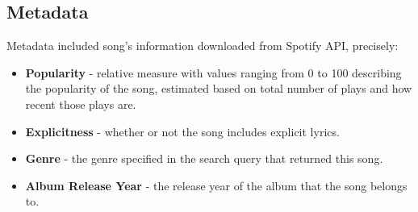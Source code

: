 

\subsection{Metadata}
\label{sec:metadata}
Metadata included song's information downloaded from Spotify API, precisely:

\begin{itemize}
  \item \textbf{Popularity} - relative measure with values ranging from 0 to
    100 describing the popularity of the song, estimated based on total
    number of plays and how recent  those plays are.
  \item \textbf{Explicitness} - whether or not the song includes explicit
    lyrics.
  \item \textbf{Genre} - the genre specified in the search query that returned
    this song.
  \item \textbf{Album Release Year} - the release year of the album that the
    song belongs to.
\end{itemize}


